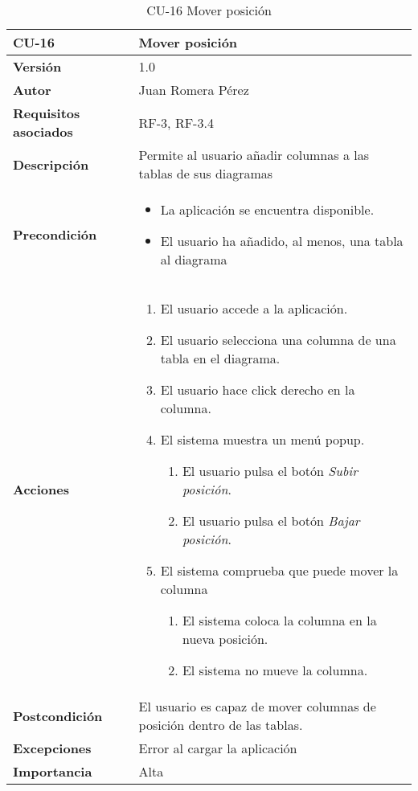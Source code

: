 \begin{table}[p]
    \centering
    \begin{tabularx}{\linewidth}{ p{} p{}}
		\toprule
		\textbf{CU-16}    & \textbf{Mover posición}\\
		\toprule
		\textbf{Versión}              & 1.0    \\
		\textbf{Autor}                & Juan Romera Pérez \\
		\textbf{Requisitos asociados} & RF-3, RF-3.4 \\
		\textbf{Descripción}          & Permite al usuario añadir columnas a las tablas de sus diagramas \\
		\textbf{Precondición}         & \begin{itemize}
		    \item La aplicación se encuentra disponible.
            \item El usuario ha añadido, al menos, una tabla al diagrama
		\end{itemize} \\
		\textbf{Acciones}             &
		\begin{enumerate}
			\def\labelenumi{\arabic{enumi}.}
			\tightlist
			\item El usuario accede a la aplicación.
            \item El usuario selecciona una columna de una tabla en el diagrama.
            \item El usuario hace click derecho en la columna.
            \item El sistema muestra un menú popup.
            \begin{enumerate}
                \item El usuario pulsa el botón \emph{Subir posición}.
                \item El usuario pulsa el botón \emph{Bajar posición}.
            \end{enumerate}
            \item El sistema comprueba que puede mover la columna
            \begin{enumerate}
                \item El sistema coloca la columna en la nueva posición.
                \item El sistema no mueve la columna.
            \end{enumerate}
		\end{enumerate}\\
		\textbf{Postcondición}        & El usuario es capaz de mover columnas de posición dentro de las tablas. \\
		\textbf{Excepciones}          & Error al cargar la aplicación \\
		\textbf{Importancia}          & Alta \\
		\bottomrule
    \end{tabularx}
    \caption{CU-16 Mover posición}
\end{table}


